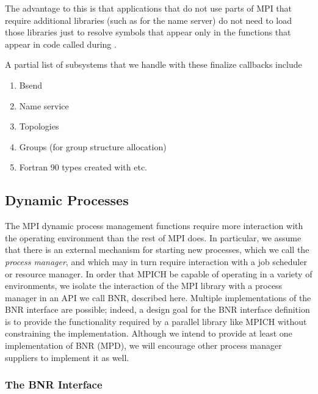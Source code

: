 \documentclass{article}
\begin{document}
The advantage to this is that applications that do not use parts of
MPI that require additional libraries (such as  for the
name server) do not need to load those libraries just to resolve
symbols that appear only in the functions that appear in code called
during .  

A partial list of subsystems that we handle with these finalize
callbacks include 
\begin{enumerate}
\item Bsend 
\item Name service
\item Topologies
\item Groups (for group structure allocation)
\item Fortran 90 types created with  etc.
\end{enumerate}

\subsection{Dynamic Processes}
\label{sec:spawn}

The MPI dynamic process management functions require more interaction with the
operating environment than the rest of MPI does.  In particular, we assume
that there is an external mechanism for starting new processes, which we call
the {\em process manager}, and which may in turn require interaction with a
job scheduler or resource manager.  In order that MPICH be capable of
operating in a variety of environments, we isolate the interaction of the MPI
library with a process manager in an API we call BNR, described here.
Multiple implementations of the BNR interface are possible;  indeed, a
design goal for the BNR interface definition is to provide the functionality
required by a parallel library like MPICH without constraining the
implementation.  Although we intend to provide at least one implementation of
BNR (MPD), we will encourage other process manager suppliers to implement it
as well.

\subsubsection{The BNR Interface}
\label{sec:bnr}
\end{document}

